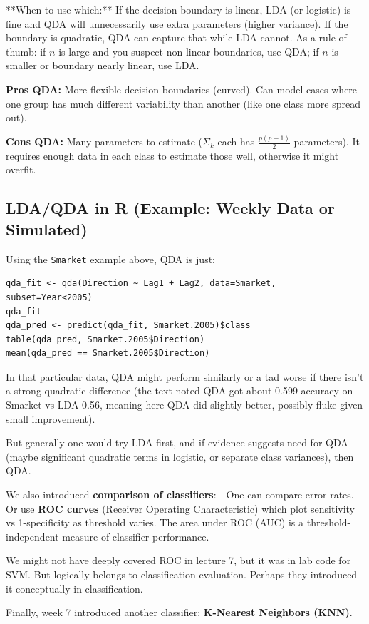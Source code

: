 \documentclass[11pt]{article}
\begin{document}
**When to use which:** If the decision boundary is linear, LDA (or logistic) is fine and QDA will unnecessarily use extra parameters (higher variance). If the boundary is quadratic, QDA can capture that while LDA cannot. As a rule of thumb: if $n$ is large and you suspect non-linear boundaries, use QDA; if $n$ is smaller or boundary nearly linear, use LDA.

\textbf{Pros QDA:} More flexible decision boundaries (curved). Can model cases where one group has much different variability than another (like one class more spread out).

\textbf{Cons QDA:} Many parameters to estimate ($\Sigma_k$ each has $\frac{p(p+1)}{2}$ parameters). It requires enough data in each class to estimate those well, otherwise it might overfit.

\subsection{LDA/QDA in R (Example: Weekly Data or Simulated)}
Using the \texttt{Smarket} example above, QDA is just:
\begin{verbatim}
qda_fit <- qda(Direction ~ Lag1 + Lag2, data=Smarket, subset=Year<2005)
qda_fit
qda_pred <- predict(qda_fit, Smarket.2005)$class
table(qda_pred, Smarket.2005$Direction)
mean(qda_pred == Smarket.2005$Direction)
\end{verbatim}
In that particular data, QDA might perform similarly or a tad worse if there isn’t a strong quadratic difference (the text noted QDA got about 0.599 accuracy on Smarket vs LDA 0.56, meaning here QDA did slightly better, possibly fluke given small improvement).

But generally one would try LDA first, and if evidence suggests need for QDA (maybe significant quadratic terms in logistic, or separate class variances), then QDA.

We also introduced \textbf{comparison of classifiers}:
- One can compare error rates.
- Or use \textbf{ROC curves} (Receiver Operating Characteristic) which plot sensitivity vs 1-specificity as threshold varies. The area under ROC (AUC) is a threshold-independent measure of classifier performance.

We might not have deeply covered ROC in lecture 7, but it was in lab code for SVM. But logically belongs to classification evaluation. Perhaps they introduced it conceptually in classification.

Finally, week 7 introduced another classifier: \textbf{K-Nearest Neighbors (KNN)}.
\end{document}
